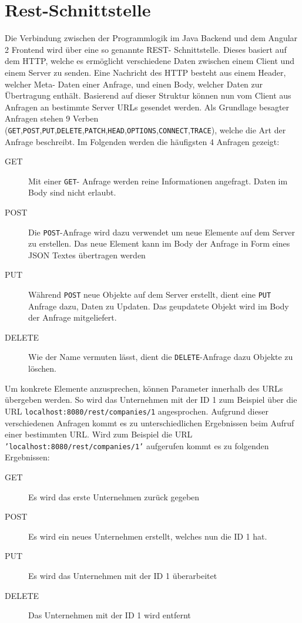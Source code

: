 
\section{Rest-Schnittstelle}

Die Verbindung zwischen der Programmlogik im Java Backend und dem Angular 2 Frontend wird über eine so genannte \acf{REST}- Schnittstelle. Dieses basiert auf dem \acf{HTTP}, welche es ermöglicht verschiedene Daten zwischen einem Client und einem Server zu senden.
Eine Nachricht des \acl{HTTP} besteht aus einem Header, welcher Meta- Daten einer Anfrage, und einen Body, welcher Daten zur Übertragung enthält.
Basierend auf dieser Struktur können nun vom Client aus Anfragen an bestimmte Server URLs gesendet werden. Als Grundlage besagter Anfragen stehen 9 Verben (\texttt{GET},\texttt{POST},\texttt{PUT},\texttt{DELETE},\texttt{PATCH},\texttt{HEAD},\texttt{OPTIONS},\texttt{CONNECT},\texttt{TRACE}), welche die Art der Anfrage beschreibt. Im Folgenden werden die häufigsten 4 Anfragen gezeigt:

\begin{description} 
	\item  [GET] {Mit einer \texttt{GET}- Anfrage werden reine Informationen angefragt. Daten im Body sind nicht erlaubt.}
	\item [POST]{Die \texttt{POST}-Anfrage wird dazu verwendet um neue Elemente auf dem Server zu erstellen. Das neue Element kann im Body der Anfrage in Form eines JSON Textes übertragen werden}
	\item [PUT]{Während \texttt{POST} neue Objekte auf dem Server erstellt, dient eine \texttt{PUT} Anfrage dazu, Daten zu Updaten. Das geupdatete Objekt wird im Body der Anfrage mitgeliefert}.
	\item[DELETE] {Wie der Name vermuten lässt, dient die \texttt{DELETE}-Anfrage dazu Objekte zu löschen}.
	
\end{description}

Um konkrete Elemente anzusprechen, können Parameter innerhalb des URLs übergeben werden. So wird das Unternehmen mit der ID 1 zum Beispiel über die URL 
\texttt{localhost:8080/rest/companies/1} angesprochen.
Aufgrund dieser verschiedenen Anfragen kommt es zu unterschiedlichen Ergebnissen beim Aufruf einer bestimmten URL. Wird zum Beispiel die URL \texttt{'localhost:8080/rest/companies/1'} aufgerufen kommt es zu folgenden Ergebnissen:

\begin{description} 
	\item[GET] Es wird das erste Unternehmen zurück gegeben
	\item[POST] Es wird ein neues Unternehmen erstellt, welches nun die ID 1 hat.
	\item[PUT] Es wird das Unternehmen mit der ID 1 überarbeitet
	\item[DELETE] Das Unternehmen mit der ID 1 wird entfernt
\end{description}

